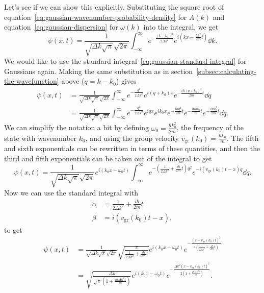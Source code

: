 \documentclass[../quantum_mechanics.tex]{subfiles}
\begin{document}
            Let's see if we can show this explicitly.
            Substituting the square root of equation~\ref{eq:gaussian-wavenumber-probability-density} for $A(k)$ and equation~\ref{eq:gaussian-dispersion} for $\omega(k)$ into the integral, we get
            \begin{equation}
                \psi(x,t)=\frac{1}{\sqrt{\Delta k\sqrt{\pi}}\sqrt{2\pi}}\int_{-\infty}^\infty e^{-\frac{(k-k_0)^2}{2\Delta k^2}}e^{i\left(kx-\frac{\hbar k^2}{2m}t\right)}\dd{k}.
            \end{equation}
            We would like to use the standard integral~\ref{eq:gaussian-standard-integral} for Gaussians again.
            Making the same substitution as in section~\ref{subsec:calculating-the-wavefunction} above ($q=k-k_0$) gives
            \begin{align}
                \psi(x,t)&=\frac{1}{\sqrt{\Delta k\sqrt{\pi}}\sqrt{2\pi}}\int_{-\infty}^\infty e^{-\frac{q^2}{2\Delta k^2}}e^{i(q+k_0)x}e^{-\frac{i\hbar(q+k_0)^2}{2m}t}\dd{q}\\
                &=\frac{1}{\sqrt{\Delta k\sqrt{\pi}}\sqrt{2\pi}}\int_{-\infty}^\infty e^{-\frac{q^2}{2\Delta k^2}}e^{iqx}e^{ik_0x}e^{-\frac{i\hbar q^2}{2m}t}e^{-\frac{i\hbar qk_0}{m}t}e^{-\frac{i\hbar k_0^2}{2m}t}\dd{q}.
            \end{align}
            We can simplify the notation a bit by defining $\omega_0=\frac{\hbar k_0^2}{2m}$, the frequency of the state with wavenumber $k_0$, and using the group velocity $v_\text{gr}(k_0)=\frac{\hbar k_0}{m}$.
            The fifth and sixth exponentials can be rewritten in terms of these quantities, and then the third and fifth exponentials can be taken out of the integral to get
            \begin{equation}
                \psi(x,t)=\frac{1}{\sqrt{\Delta k\sqrt{\pi}}\sqrt{2\pi}}e^{i(k_0x-\omega_0 t)}\int_{-\infty}^\infty e^{-\left(\frac{1}{2\Delta k^2}+\frac{i\hbar}{2m}t\right)q^2}e^{-i(v_\text{gr}(k_0)t-x)q}\dd{q}.
            \end{equation}
            Now we can use the standard integral with
            \begin{align}
                \alpha&=\frac{1}{2\Delta k^2}+\frac{i\hbar}{2m}t\\
                \beta&=i(v_\text{gr}(k_0)t-x),
            \end{align}
            to get
            \begin{align}
                \psi(x,t)&=\frac{1}{\sqrt{\Delta k\sqrt{\pi}}\sqrt{2\pi}}\sqrt{\frac{\pi}{\frac{1}{2\Delta k^2}+\frac{i\hbar}{2m}t}}e^{i(k_0x-\omega_0 t)}e^{-\frac{(x-v_\text{gr}(k_0)t)^2}{4\left(\frac{1}{2\Delta k^2}+\frac{i\hbar}{2m}t\right)}}\\
                &=\sqrt{\frac{\Delta k}{\sqrt{\pi}\left(1+\frac{i\hbar\Delta k^2t}{m}\right)}}e^{i(k_0x-\omega_0 t)}e^{-\frac{\Delta k^2(x-v_\text{gr}(k_0)t)^2}{2\left(1+\frac{i\hbar\Delta k^2t}{m}\right)}}.
            \end{align}
\end{document}
